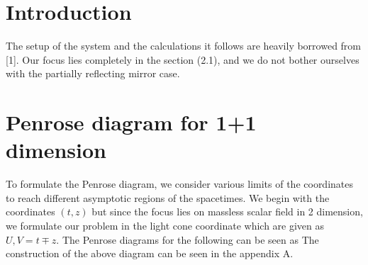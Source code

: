 

% 




\section{Introduction}
The setup of the system and the calculations it follows are heavily borrowed from [1]. Our focus lies completely in the section (2.1), and we do not bother ourselves with the partially reflecting mirror case.

\section{Penrose diagram for 1+1 dimension}
To formulate the Penrose diagram, we consider various limits of the coordinates to reach different asymptotic regions of the spacetimes. We begin with the coordinates $(t,z)$ but since the focus lies on massless scalar field in 2 dimension, we formulate our problem in the light cone coordinate which are given as $U, V=t\mp z$. The Penrose diagrams for the following can be seen as The construction of the above diagram can be seen in the appendix A.

